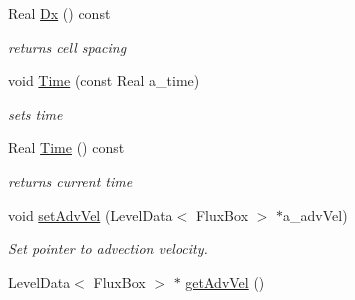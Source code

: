 \begin{DoxyCompactItemize}
\item 
\hypertarget{class_phys_b_c_util_a29d26fc7ceda182a4854307f6f8d62ae}{Real \hyperlink{class_phys_b_c_util_a29d26fc7ceda182a4854307f6f8d62ae}{Dx} () const }\label{class_phys_b_c_util_a29d26fc7ceda182a4854307f6f8d62ae}

\begin{DoxyCompactList}\small\item\em returns cell spacing \end{DoxyCompactList}\item 
\hypertarget{class_phys_b_c_util_ab0e771887c439318b0501b9f67a1b8c2}{void \hyperlink{class_phys_b_c_util_ab0e771887c439318b0501b9f67a1b8c2}{Time} (const Real a\-\_\-time)}\label{class_phys_b_c_util_ab0e771887c439318b0501b9f67a1b8c2}

\begin{DoxyCompactList}\small\item\em sets time \end{DoxyCompactList}\item 
\hypertarget{class_phys_b_c_util_a1b2bda9dea48021098134c846f487c6d}{Real \hyperlink{class_phys_b_c_util_a1b2bda9dea48021098134c846f487c6d}{Time} () const }\label{class_phys_b_c_util_a1b2bda9dea48021098134c846f487c6d}

\begin{DoxyCompactList}\small\item\em returns current time \end{DoxyCompactList}\item 
\hypertarget{class_phys_b_c_util_aacb13faac8c92afafe5ddc7d667e6181}{void \hyperlink{class_phys_b_c_util_aacb13faac8c92afafe5ddc7d667e6181}{set\-Adv\-Vel} (Level\-Data$<$ Flux\-Box $>$ $\ast$a\-\_\-adv\-Vel)}\label{class_phys_b_c_util_aacb13faac8c92afafe5ddc7d667e6181}

\begin{DoxyCompactList}\small\item\em Set pointer to advection velocity. \end{DoxyCompactList}\item 
\hypertarget{class_phys_b_c_util_ae121a247bdd5732a82af904ac77257e8}{Level\-Data$<$ Flux\-Box $>$ $\ast$ \hyperlink{class_phys_b_c_util_ae121a247bdd5732a82af904ac77257e8}{get\-Adv\-Vel} ()}\label{class_phys_b_c_util_ae121a247bdd5732a82af904ac77257e8}


\end{DoxyCompactItemize}
